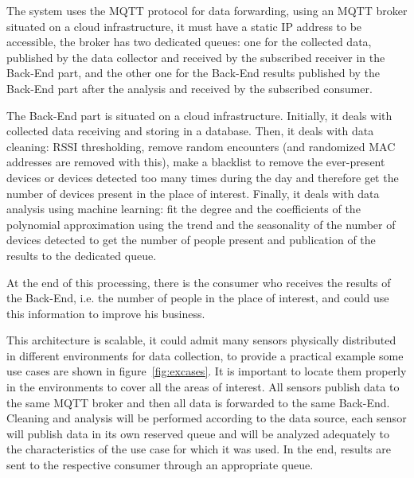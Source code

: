 The system uses the MQTT protocol for data forwarding, using an MQTT broker situated on a cloud infrastructure, it must have a static IP address to be accessible, the broker has two dedicated queues: one for the collected data, published by the data collector and received by the subscribed receiver in the Back-End part, and the other one for the Back-End results published by the Back-End part after the analysis and received by the subscribed consumer.

The Back-End part is situated on a cloud infrastructure. Initially, it deals with collected data receiving and storing in a database. Then, it deals with data cleaning: RSSI thresholding, remove random encounters (and randomized MAC addresses are removed with this), make a blacklist to remove the ever-present devices or devices detected too many times during the day and therefore get the number of devices present in the place of interest. Finally, it deals with data analysis using machine learning: fit the degree and the coefficients of the polynomial approximation using the trend and the seasonality of the number of devices detected to get the number of people present and publication of the results to the dedicated queue.

At the end of this processing, there is the consumer who receives the results of the Back-End, i.e. the number of people in the place of interest, and could use this information to improve his business.

This architecture is scalable, it could admit many sensors physically distributed in different environments for data collection, to provide a practical example some use cases are shown in figure~\ref{fig:excases}. It is important to locate them properly in the environments to cover all the areas of interest. All sensors publish data to the same MQTT broker and then all data is forwarded to the same Back-End. Cleaning and analysis will be performed according to the data source, each sensor will publish data in its own reserved queue and will be analyzed adequately to the characteristics of the use case for which it was used. In the end, results are sent to the respective consumer through an appropriate queue.

